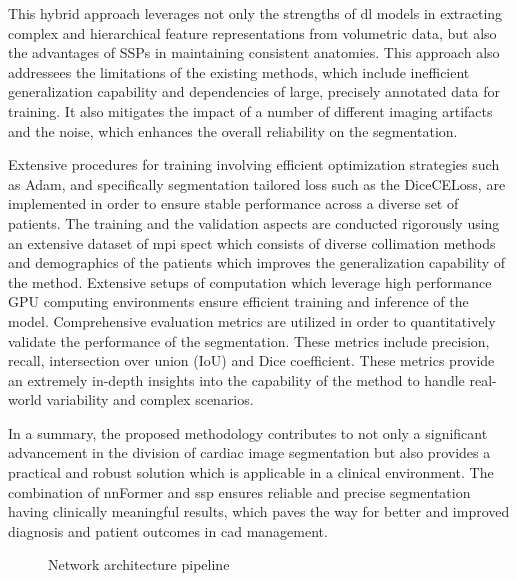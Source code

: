 This hybrid approach leverages not only the strengths of \gls{dl} models in extracting complex and hierarchical feature representations from volumetric data, but also the advantages of SSPs in maintaining consistent anatomies. This approach also addressees the limitations of the existing methods, which include inefficient generalization capability and dependencies of large, precisely annotated data for training. It also mitigates the impact of a number of different imaging artifacts and the noise, which enhances the overall reliability on the segmentation.

Extensive procedures for training involving efficient optimization strategies such as Adam, and specifically segmentation tailored loss such as the DiceCELoss, are implemented in order to ensure stable performance across a diverse set of patients. The training and the validation aspects are conducted rigorously using an extensive dataset of \gls{mpi} \gls{spect} which consists of diverse collimation methods and demographics of the patients which improves the generalization capability of the method. Extensive setups of computation which leverage high performance GPU computing environments ensure efficient training and inference of the model. Comprehensive evaluation metrics are utilized in order to quantitatively validate the performance of the segmentation. These metrics include precision, recall, intersection over union (IoU) and Dice coefficient. These metrics provide an extremely in-depth insights into the capability of the method to handle real-world variability and complex scenarios.

In a summary, the proposed methodology contributes to not only a significant advancement in the division of cardiac image segmentation but also provides a practical and robust solution which is applicable in a clinical environment. The combination of nnFormer and \gls{ssp} ensures reliable and precise segmentation having clinically meaningful results, which paves the way for better and improved diagnosis and patient outcomes in \gls{cad} management.

\begin{figure}[htb!] %
\centering
\centering
\resizebox{1\textwidth}{!}{

}
\caption{\centering Network architecture pipeline}
\label{Fig:network_pipeline}
\end{figure}

